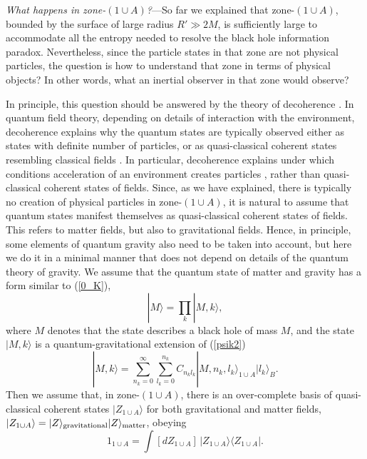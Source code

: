 \documentclass[aps,prd,onecolumn,groupedaddress,showkeys,12pt]{revtex4-2}
\begin{document}
{\it What happens in zone-$(1\!\cup\! A)$?}---So far we explained that zone-$(1\!\cup\! A)$, 
bounded by the surface of large radius $R'\gg 2M$, is sufficiently large to accommodate all the entropy needed to resolve
the black hole information paradox. Nevertheless, since the particle states in that zone are not physical particles, 
the question is how to understand that zone in terms of physical objects?
In other words, what an inertial observer in that zone would observe?

In principle, this question should be answered by the theory of decoherence \cite{decoh1,decoh2}. 
In quantum field theory, depending on details of interaction with the environment, decoherence 
explains why the quantum states are typically observed either as states with definite number of particles, 
or as quasi-classical coherent states resembling classical fields \cite{zeh,zurek}.
In particular, decoherence explains under which conditions acceleration of an environment creates particles    
\cite{hu,audretsch,kok}, rather than quasi-classical coherent states of fields. 
Since, as we have explained, there is typically no creation of physical particles in zone-$(1\!\cup\! A)$,
it is natural to assume that quantum states manifest themselves as quasi-classical coherent states of fields.   
This refers to matter fields, but also to gravitational fields. Hence, in principle, some elements of quantum 
gravity also need to be taken into account, but here we do it in a minimal manner that does not depend on 
details of the quantum theory of gravity. We assume that the quantum state of matter and gravity has a form 
similar to (\ref{0_K}), 
\begin{equation}\label{M}
|M\rangle = \prod_k |M,k\rangle , 
\end{equation}
where $M$ denotes that the state describes a black hole of mass $M$,
and the state $|M,k\rangle$ is a quantum-gravitational extension of (\ref{psik2})
\begin{equation}\label{psik4}
 |M,k\rangle = \sum_{n_k=0}^{\infty} \sum_{l_k=0}^{n_k} C_{n_kl_k} |M,n_k,l_k\rangle_{1\cup A} |l_k\rangle_B .
\end{equation}
Then we assume that, in zone-$(1\!\cup\! A)$,
there is an over-complete basis of quasi-classical coherent states $|Z_{1\cup A}\rangle$ 
for both gravitational and matter fields, $|Z_{1\cup A}\rangle=|Z\rangle_{\rm gravitational}|Z\rangle_{\rm matter}$, obeying 
\begin{equation}\label{cohZ}
1_{1\cup A}=\int [dZ_{1\cup A}]\, |Z_{1\cup A}\rangle \langle Z_{1\cup A}| .
\end{equation}
\end{document}
